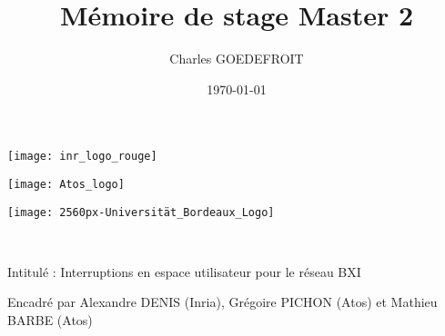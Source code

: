 \documentclass[11pt, a4paper]{article}
\title{Mémoire de stage Master 2}
\author{Charles GOEDEFROIT}
\date{\today}
\begin{document}
\begin{titlepage}
  \centering
  \begin{minipage}[t]{0.3\textwidth}
    \centering
    \vspace*{-2cm}
    \hspace*{-3.5cm}
    \texttt{[image: inr\_logo\_rouge]}
  \end{minipage}\hfill
  \begin{minipage}[t]{0.3\textwidth}
    \centering
    \vspace*{-1.8cm}
    \hspace*{-0.5cm}
    \texttt{[image: Atos\_logo]}
  \end{minipage}\hfill
  \begin{minipage}[t]{0.3\textwidth}
    \centering
    \vspace*{-2cm}
    \hspace*{0.5cm}
    \texttt{[image: 2560px-Universität\_Bordeaux\_Logo]}
  \end{minipage}

  \ {} %
  \vfill
  \vspace{1cm}
  {\scshape\Huge\MyTitle\par}
  \vspace{0.5cm}
  {\LARGE\MySubject\par}
  \vspace{0.5cm}
  {\Large Intitulé : Interruptions en espace utilisateur pour le réseau BXI\par}
  \vspace{1cm}
  {\MyAuthor\par}
  {Encadré par Alexandre DENIS (Inria), Grégoire PICHON (Atos) et Mathieu BARBE (Atos)\par}
  \vfill
  {\large\MyDate\par}
\end{titlepage}

\newpage

\tableofcontents

\newpage








% 



\renewcommand{\refname}{Bibliographie}
\let\Section\section
\def\section*#1{\Section{#1}}


\nocite{*}
\end{document}
